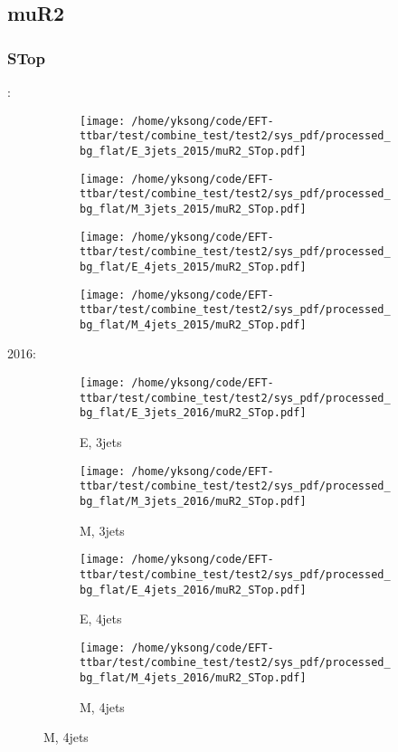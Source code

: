 \documentclass{beamer}
\begin{document}
\subsection{muR2}

\begin{frame}
\frametitle{STop}
\fontsize{5}{1}:
\begin{figure}
\centering
\begin{subfigure}[b]{0.24\textwidth}
\texttt{[image: /home/yksong/code/EFT-ttbar/test/combine\_test/test2/sys\_pdf/processed\_bg\_flat/E\_3jets\_2015/muR2\_STop.pdf]}
\end{subfigure}
\begin{subfigure}[b]{0.24\textwidth}
\texttt{[image: /home/yksong/code/EFT-ttbar/test/combine\_test/test2/sys\_pdf/processed\_bg\_flat/M\_3jets\_2015/muR2\_STop.pdf]}
\end{subfigure}
\begin{subfigure}[b]{0.24\textwidth}
\texttt{[image: /home/yksong/code/EFT-ttbar/test/combine\_test/test2/sys\_pdf/processed\_bg\_flat/E\_4jets\_2015/muR2\_STop.pdf]}
\end{subfigure}
\begin{subfigure}[b]{0.24\textwidth}
\texttt{[image: /home/yksong/code/EFT-ttbar/test/combine\_test/test2/sys\_pdf/processed\_bg\_flat/M\_4jets\_2015/muR2\_STop.pdf]}
\end{subfigure}
\end{figure}
2016:
\begin{figure}
\centering
\begin{subfigure}[b]{0.24\textwidth}
\texttt{[image: /home/yksong/code/EFT-ttbar/test/combine\_test/test2/sys\_pdf/processed\_bg\_flat/E\_3jets\_2016/muR2\_STop.pdf]}
\captionsetup{font=tiny}
\caption{E, 3jets}
\end{subfigure}
\begin{subfigure}[b]{0.24\textwidth}
\texttt{[image: /home/yksong/code/EFT-ttbar/test/combine\_test/test2/sys\_pdf/processed\_bg\_flat/M\_3jets\_2016/muR2\_STop.pdf]}
\captionsetup{font=tiny}
\caption{M, 3jets}
\end{subfigure}
\begin{subfigure}[b]{0.24\textwidth}
\texttt{[image: /home/yksong/code/EFT-ttbar/test/combine\_test/test2/sys\_pdf/processed\_bg\_flat/E\_4jets\_2016/muR2\_STop.pdf]}
\captionsetup{font=tiny}
\caption{E, 4jets}
\end{subfigure}
\begin{subfigure}[b]{0.24\textwidth}
\texttt{[image: /home/yksong/code/EFT-ttbar/test/combine\_test/test2/sys\_pdf/processed\_bg\_flat/M\_4jets\_2016/muR2\_STop.pdf]}
\captionsetup{font=tiny}
\caption{M, 4jets}
\end{subfigure}
\end{figure}
\end{frame}
\end{document}
